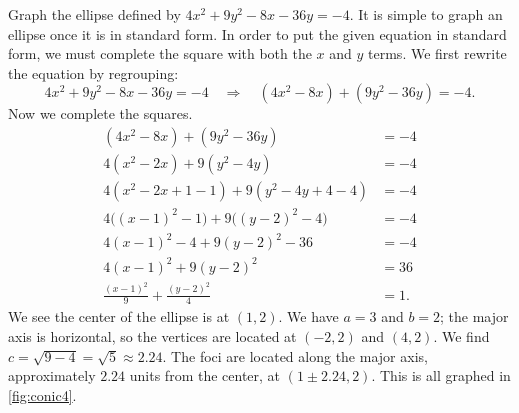 \begin{example}\label{ex_conic4}
Graph the ellipse defined by $4x^2+9y^2-8x-36y=-4$.
\solution
It is simple to graph an ellipse once it is in standard form. In order to put the given equation in standard form, we must complete the square with both the $x$ and $y$ terms. We first rewrite the equation by regrouping:
\[4x^2+9y^2-8x-36y=-4 \quad \Rightarrow \quad (4x^2-8x) + (9y^2-36y) = -4.\]
Now we complete the squares.
\begin{align*}
	(4x^2-8x) + (9y^2-36y) &= -4\\
	4(x^2-2x) + 9(y^2-4y) &= -4 \\
	4(x^2-2x +1 - 1) + 9(y^2-4y+4-4) &= - 4\\
	4\bigl((x-1)^2-1\bigr) + 9\bigl((y-2)^2-4\bigr) &= -4\\
	4(x-1)^2 -4 + 9(y-2)^2-36 &= -4 \\
	4(x-1)^2 + 9(y-2)^2 &= 36 \\
	\frac{(x-1)^2}{9} + \frac{(y-2)^2}{4} &= 1.
\end{align*}
%
%
%
We see the center of the ellipse is at $(1,2)$. We have $a=3$ and $b=2$; the major axis is horizontal, so the vertices are located at $(-2,2)$ and $(4,2)$. We find $c=\sqrt{9-4} = \sqrt{5}\approx 2.24.$ The foci are located along the major axis, approximately $2.24$ units from the center, at $(1\pm 2.24,2)$. This is all graphed in \autoref{fig:conic4}.
\end{example}

